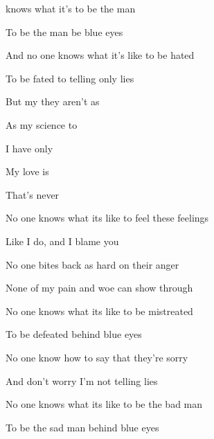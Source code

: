 

\zs
{} knows what it's 
to be the  man

To be the  man
be blue eyes

And no one knows
what it's like to be hated

To be fated to telling only lies
\ks

\zr
But my  they aren't as 

As my science  to  

I have  only 

My love is 

That's never 
\kr

\zs
No one knows what its like
to feel these feelings

Like I do, and I blame you

No one bites back as hard on their anger

None of my pain and woe can show through
\ks

\zr \kr

\zs
No one knows what its like
to be mistreated

To be defeated behind blue eyes

No one know how to say that they're sorry

And don't worry I'm not telling lies
\ks

\zr \kr

\zs
No one knows what its like
to be the bad man

To be the sad man
behind blue eyes
\ks

\kp



